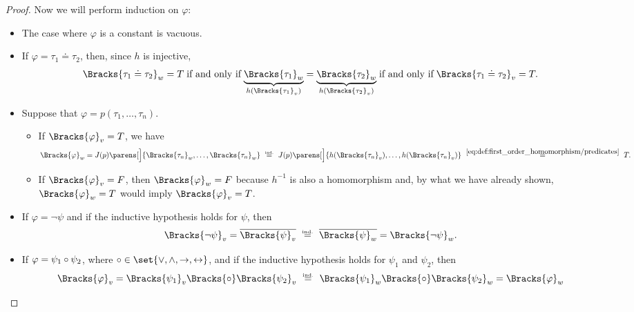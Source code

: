 \begin{proof}
  Now we will perform induction on \( \varphi \):
  \begin{itemize}
    \item The case where \( \varphi \) is a constant is vacuous.
    \item If \( \varphi = \tau_1 \doteq \tau_2 \), then, since \( h \) is injective,
    \begin{equation*}
      \Bracks{\tau_1 \doteq \tau_2}_w = T
      \T{if and only if}
      \underbrace{\Bracks{\tau_1}_w}_{h(\Bracks{\tau_1}_v)} = \underbrace{\Bracks{\tau_2}_w}_{h(\Bracks{\tau_2}_v)}
      \T{if and only if}
      \Bracks{\tau_1 \doteq \tau_2}_v = T.
    \end{equation*}

    \item Suppose that \( \varphi = p(\tau_1, \ldots, \tau_n) \).
    \begin{itemize}
      \item If \( \Bracks{\varphi}_v = T \), we have
      \begin{equation*}
        \Bracks{\varphi}_w
        =
        J(p)\parens[\Big]{ \Bracks{\tau_n}_w, \ldots, \Bracks{\tau_n}_w }
        \reloset {\T{ind.}} =
        J(p)\parens[\Big]{ h(\Bracks{\tau_n}_v), \ldots, h(\Bracks{\tau_n}_v) }
        \reloset {\eqref{eq:def:first_order_homomorphism/predicates}} =
        T.
      \end{equation*}

      \item If \( \Bracks{\varphi}_v = F \), then \( \Bracks{\varphi}_w = F \) because \( h^{-1} \) is also a homomorphism and, by what we have already shown, \( \Bracks{\varphi}_w = T \) would imply \( \Bracks{\varphi}_v = T \).
    \end{itemize}

    \item If \( \varphi = \neg \psi \) and if the inductive hypothesis holds for \( \psi \), then
    \begin{equation*}
      \Bracks{\neg \psi}_v
      =
      \overline{\Bracks{\psi}_v}
      \reloset {\T{ind.}} =
      \overline{\Bracks{\psi}_w}
      =
      \Bracks{\neg \psi}_w.
    \end{equation*}

    \item If \( \varphi = \psi_1 \bincirc \psi_2 \), where \( \bincirc \in \set{ \vee, \wedge, \rightarrow, \leftrightarrow } \), and if the inductive hypothesis holds for \( \psi_1 \) and \( \psi_2 \), then
    \begin{equation*}
      \Bracks{\varphi}_v
      =
      \Bracks{\psi_1}_v \Bracks{\bincirc} \Bracks{\psi_2}_v
      \reloset {\T{ind.}} =
      \Bracks{\psi_1}_w \Bracks{\bincirc} \Bracks{\psi_2}_w
      =
      \Bracks{\varphi}_w
    \end{equation*}


\end{itemize}
\end{proof}
